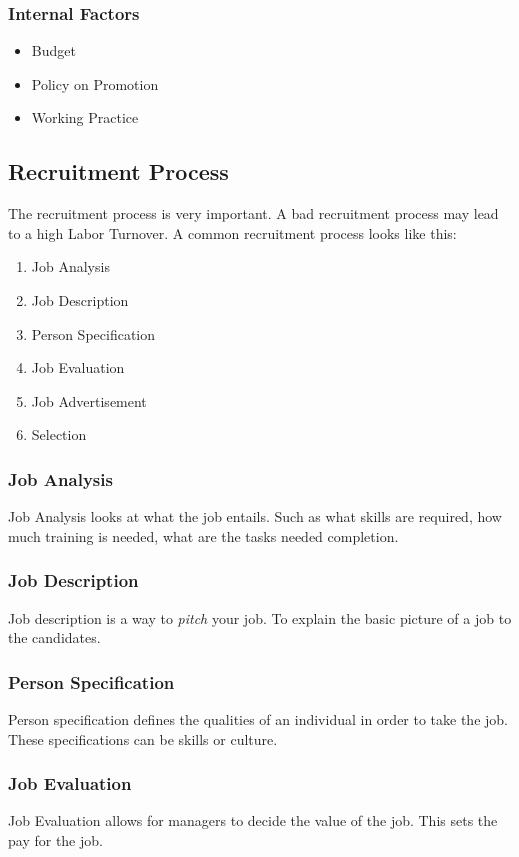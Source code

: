 \documentclass{standalone}
\begin{document}
\subsubsection{Internal Factors}
\begin{itemize}
	\item Budget
	\item Policy on Promotion
	\item Working Practice
\end{itemize}

\subsection{Recruitment Process}
The recruitment process is very important.
A bad recruitment process may lead to a high Labor Turnover.
A common recruitment process looks like this: 
\begin{enumerate}
	\item Job Analysis
	\item Job Description
	\item Person Specification
	\item Job Evaluation
	\item Job Advertisement
	\item Selection
\end{enumerate}

\subsubsection{Job Analysis}
Job Analysis looks at what the job entails.
Such as what skills are required, how much training is needed, what are the tasks needed completion.

\subsubsection{Job Description}
Job description is a way to \textit{pitch} your job.
To explain the basic picture of a job to the candidates.

\subsubsection{Person Specification}
Person specification defines the qualities of an individual in order to take the job.
These specifications can be skills or culture.

\subsubsection{Job Evaluation}
Job Evaluation allows for managers to decide the value of the job.
This sets the pay for the job.
\end{document}
